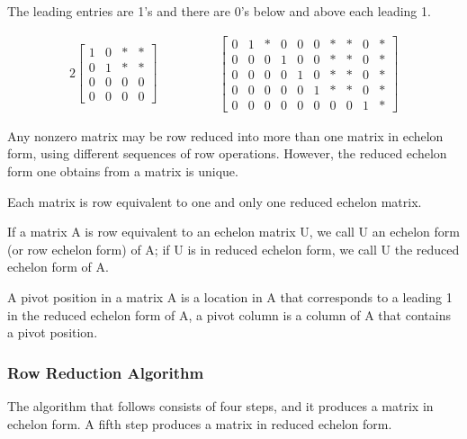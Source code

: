 \documentclass{article}
\begin{document}
The leading entries are 1's and there are 0's below and above each leading 1.

\begin{alignat*}{2}
    \begin{bmatrix}
        1&0&*&*\\
        0&1&*&*\\
        0&0&0&0\\
        0&0&0&0
    \end{bmatrix}
    & \hspace{ 4em}%
    \begin{bmatrix}
        0&1&*&0&0&0&*&*&0&*\\
        0&0&0&1&0&0&*&*&0&*\\
        0&0&0&0&1&0&*&*&0&*\\
        0&0&0&0&0&1&*&*&0&*\\
        0&0&0&0&0&0&0&0&1&*
    \end{bmatrix}
\end{alignat*}

\noindent Any nonzero matrix may be row reduced into more than one matrix in echelon form, using different sequences of row operations. However, the reduced echelon form one obtains from a matrix is unique.

\begin{tcolorbox}[colback=blue!10!white,colframe=blue!60!black,title=Uniqueness of Row Reduced Echelon Form ]
    Each matrix is row equivalent to one and only one reduced echelon matrix.
\end{tcolorbox}
    
If a matrix A is row equivalent to an echelon matrix U, we call U an echelon form (or row echelon form) of A; if U is in reduced echelon form, we call U the reduced echelon form of A.

\begin{tcolorbox}[colback=blue!10!white,colframe=blue!60!black,title=Pivot Positions]
    A pivot position in a matrix A is a location in A that corresponds to a leading 1 in the reduced echelon form of A, a pivot column is a column of A that contains a pivot position.
\end{tcolorbox}

\subsubsection*{Row Reduction Algorithm}

The algorithm that follows consists of four steps, and it produces a matrix in echelon form. A fifth step produces a matrix in reduced echelon form. \newline
\end{document}
